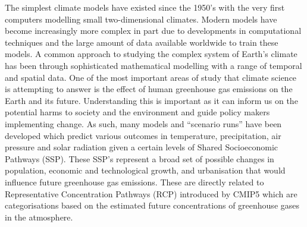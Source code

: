 \documentclass[honours,12pt]{unswthesis}
\numberwithin{equation}{section}
\begin{document}
{\noindent}The simplest climate models have existed since the 1950's with the very first computers modelling small two-dimensional climates\cite{edwards2011history}. 
Modern models have become increasingly more complex in part due to developments in computational techniques and the large amount of data available worldwide to train these models.\cite{article}
A common approach to studying the complex system of Earth's climate has been through sophisticated mathematical modelling with a range of temporal and spatial data\cite{Kulinich_2022}. 
One of the most important areas of study that climate science is attempting to answer is the effect of human greenhouse gas emissions on the Earth and its future.
Understanding this is important as it can inform us on the potential harms to society and the environment and guide policy makers implementing change. As such, many models
and ``scenario runs'' have been developed which predict various outcomes in temperature, precipitation, air pressure and solar radiation given a certain levels of 
Shared Socioeconomic Pathways (SSP).\cite{RIAHI2017153} These SSP's represent a broad set of possible changes in population, economic and technological growth, and urbanisation
that would influence future greenhouse gas emissions. These are directly related to Representative Concentration Pathways (RCP) introduced by CMIP5 which are categorisations based on the 
estimated future concentrations of greenhouse gases in the atmosphere.\cite{Harrisson_2021_SSP}
\end{document}

